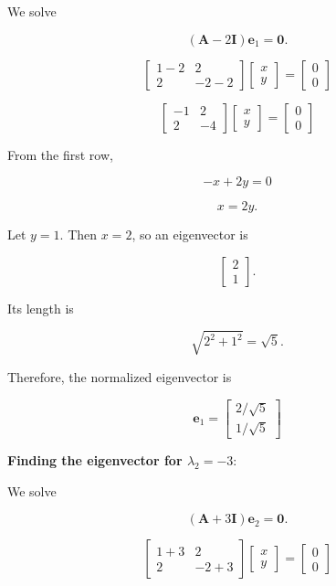 \documentclass[12pt]{article}
\begin{document}
\noindent We solve

$$
(\mathbf{A}-2\mathbf{I})\mathbf{e}_1=\mathbf{0}.
$$

$$
\begin{bmatrix}
1-2 & 2\\
2 & -2-2
\end{bmatrix}
\begin{bmatrix}
x\\
y
\end{bmatrix}
=
\begin{bmatrix}
0\\
0
\end{bmatrix}
$$

$$
\begin{bmatrix}
-1 & 2\\
2 & -4
\end{bmatrix}
\begin{bmatrix}
x\\
y
\end{bmatrix}
=
\begin{bmatrix}
0\\
0
\end{bmatrix}
$$

\noindent From the first row,

$$
-x+2y=0
$$

$$
x=2y.
$$

\noindent Let $y=1$. Then $x=2$, so an eigenvector is

$$
\begin{bmatrix}
2\\
1
\end{bmatrix}.
$$

\noindent Its length is

$$
\sqrt{2^2+1^2}=\sqrt{5}.
$$

\noindent Therefore, the normalized eigenvector is

$$
\boxed{
\mathbf{e}_1=
\begin{bmatrix}
2/\sqrt{5}\\
1/\sqrt{5}
\end{bmatrix}
}
$$

\vspace{1em}

\noindent \textbf{Finding the eigenvector for $\lambda_2 = -3$}:

\noindent We solve

$$
(\mathbf{A}+3\mathbf{I})\mathbf{e}_2=\mathbf{0}.
$$

$$
\begin{bmatrix}
1+3 & 2\\
2 & -2+3
\end{bmatrix}
\begin{bmatrix}
x\\
y
\end{bmatrix}
=
\begin{bmatrix}
0\\
0
\end{bmatrix}
$$
\end{document}
